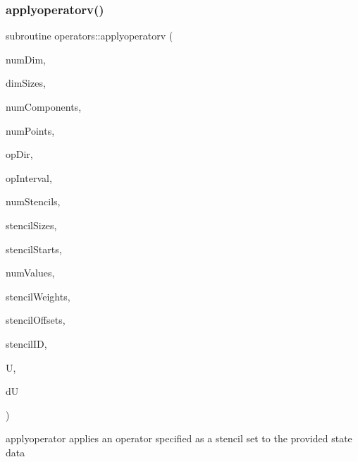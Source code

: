 \subsubsection{\texorpdfstring{applyoperatorv()}{applyoperatorv()}}
{\footnotesize\ttfamily subroutine operators\+::applyoperatorv (\begin{DoxyParamCaption}\item[{integer(kind=4), intent(in)}]{num\+Dim,  }\item[{integer(kind=8), dimension(numdim), intent(in)}]{dim\+Sizes,  }\item[{integer(kind=4), intent(in)}]{num\+Components,  }\item[{integer(kind=8), intent(in)}]{num\+Points,  }\item[{integer(kind=4), intent(in)}]{op\+Dir,  }\item[{integer(kind=8), dimension(2$\ast$numdim), intent(in)}]{op\+Interval,  }\item[{integer(kind=4), intent(in)}]{num\+Stencils,  }\item[{integer(kind=4), dimension(numstencils), intent(in)}]{stencil\+Sizes,  }\item[{integer(kind=4), dimension(numstencils), intent(in)}]{stencil\+Starts,  }\item[{integer(kind=4), intent(in)}]{num\+Values,  }\item[{real(kind=8), dimension(numvalues), intent(in)}]{stencil\+Weights,  }\item[{integer(kind=4), dimension(numvalues), intent(in)}]{stencil\+Offsets,  }\item[{integer(kind=4), dimension(numpoints), intent(in)}]{stencil\+ID,  }\item[{real(kind=8), dimension(numpoints$\ast$numcomponents), intent(in), target}]{U,  }\item[{real(kind=8), dimension(numpoints$\ast$numcomponents), intent(out), target}]{dU }\end{DoxyParamCaption})}



applyoperator applies an operator specified as a stencil set to the provided state data 

